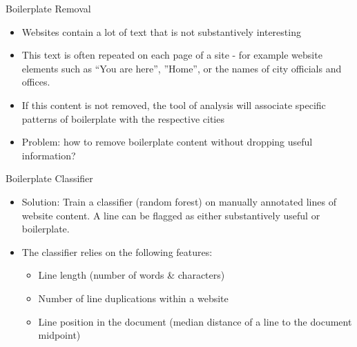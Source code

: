 \documentclass{beamer}
\begin{document}
\begin{frame}[fragile]
\begin{columns}[T]
\begin{column}{.4\textwidth}
\begin{block}{Boilerplate Removal}
\begin{itemize}
\item Websites contain a lot of text that is not substantively interesting
\item This text is often repeated on each page of a site - for example website elements such as ``You are here'', ''Home'', or the names of city officials and offices.
\item If this content is not removed, the tool of analysis will associate specific patterns of boilerplate with the respective cities
\item Problem: how to remove boilerplate content without dropping useful information?
\end{itemize}
\end{block}

\begin{block}{Boilerplate Classifier}
\begin{itemize}
\item Solution: Train a classifier (random forest) on manually annotated lines of website content. A line can be flagged as either substantively useful or boilerplate.
\item The classifier relies on the following features:
\begin{itemize}
\item Line length (number of words & characters)
\item Number of line duplications within a website
\item Line position in the document (median distance of a line to the document midpoint)
\end{itemize}
\end{itemize}
\end{block}

\end{column}



\end{columns}
\end{frame}
\end{document}
